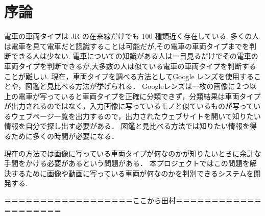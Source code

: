 

\chapter{序論}

電車の車両タイプは JR の在来線だけでも 100 種類近く存在している.
多くの人は電車を見て電車だと認識することは可能だが,その電車の車両タイプまでを判断できる人は少ない.
電車についての知識がある人は一目見るだけでその電車の車両タイプを判断できるが,大多数の人は似ている電車の車両タイプを判断することが難しい.
現在，車両タイプを調べる方法としてGoogle レンズを使用することや，図鑑と見比べる方法が挙げられる．
Googleレンズは一枚の画像に２つ以上の電車が写っていると車両タイプを正確に分類できず，分類結果は車両タイプが出力されるのではなく，入力画像に写っているモノと似ているものが写っているウェブページ一覧を出力するので，出力されたウェブサイトを開いて知りたい情報を自分で探し出す必要がある．
図鑑と見比べる方法では知りたい情報を得るために多くの時間が必要になる．

現在の方法では画像に写っている車両タイプが何なのかが知りたいときに余計な手間をかける必要があるという問題がある．
本プロジェクトではこの問題を解決するために画像や動画に写っている車両が何なのかを判別できるシステムを開発する.

＝＝＝＝＝＝＝＝＝＝＝＝＝＝＝＝＝＝ここから田村＝＝＝＝＝＝＝＝＝＝＝＝＝＝＝＝＝＝＝＝\\


